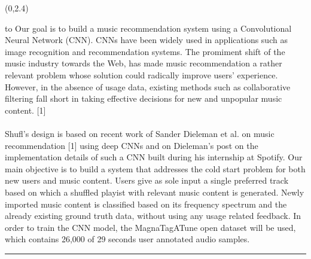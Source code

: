 \documentclass[a0]{a0poster}
\def\Head#1{
  \noindent\hbox to \hsize{\hfil{\LARGE\color{DarkBlue}\sf #1}}\bigskip}
\begin{document}
  \begin{textblock}{7}(0,2.4)
    \Head{Introduction}
    \sf %
    Our goal is to build a music recommendation system using a Convolutional
    Neural Network (CNN). CNNs have been widely used in applications such as
    image recognition and recommendation systems. The promiment shift of the
    music industry towards the Web, has made music recommendation a rather
    relevant problem whose solution could radically improve users' experience.
    However, in the absence of usage data, existing methods such as
    collaborative filtering fall short in taking effective decisions for new
    and unpopular music content. [1]
    \\ \\
    Shufl's design is based on recent work of Sander Dieleman et al. on music
    recommendation [1] using deep CNNs and on Dieleman's post on the
    implementation details of such a CNN built during his internship at
    Spotify. Our main objective is to build a system that addresses the cold
    start problem for both new users and music content. Users give as sole
    input a single preferred track based on which a shuffled playist with
    relevant music content is generated. Newly imported music content is
    classified based on its frequency spectrum and the already existing ground
    truth data, without using any usage related feedback. In order to train
    the CNN model, the MagnaTagATune open dataset will be used, which contains
    26,000 of 29 seconds user annotated audio samples.

    \bigskip
    \hrule
  \end{textblock}
\end{document}
